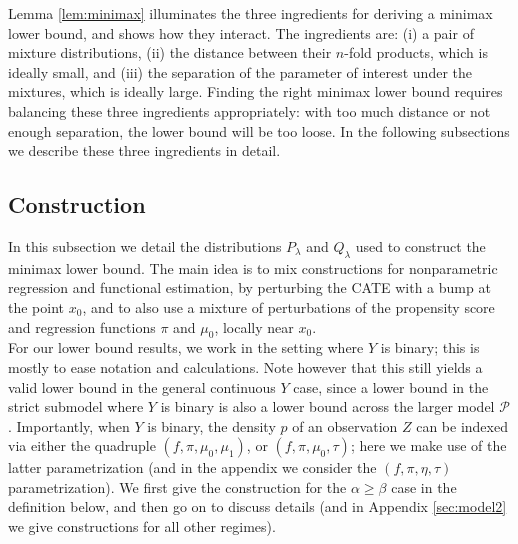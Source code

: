 \documentclass[11pt,twoside]{article}
\newcommand{\E}{\mathbb{E}}
\theoremstyle{definition}
\theoremstyle{remark}
\begin{document}
\bigskip

Lemma \ref{lem:minimax} illuminates the three ingredients for deriving a minimax lower bound, and shows how they interact. The ingredients are: (i) a pair of mixture distributions, (ii) the distance between their $n$-fold products, which is ideally small, and  (iii) the separation of the parameter of interest under the mixtures, which is ideally large. Finding the right minimax lower bound requires balancing these three ingredients appropriately: with too much distance or not enough separation,  the lower bound will be too loose. In the following subsections we describe these three ingredients in detail. \\

\subsection{Construction}

In this subsection we detail the distributions $P_\lambda$ and $Q_\lambda$ used to construct the minimax lower bound. 
The main idea is to mix constructions for nonparametric regression and functional estimation, by perturbing the CATE with a bump at the point $x_0$, and to also use a mixture of perturbations of the propensity score and regression functions $\pi$ and $\mu_0$,  locally near $x_0$.  \\

For our lower bound results, we work in the setting where $Y$ is binary; this is mostly to ease notation and calculations. Note however that this still yields a valid lower bound in the general continuous $Y$ case, since a lower bound in the strict submodel where $Y$ is binary is also a lower bound across the larger model $\mathcal{P}$. Importantly, when $Y$ is binary, the density $p$ of an observation $Z$ can be  indexed via either the quadruple $(f,\pi,\mu_0,\mu_1)$, or $(f,\pi,\mu_0,\tau)$; here we make use of the latter parametrization (and in the appendix we consider the $(f,\pi,\eta,\tau)$ parametrization). 
We first give the construction for the $\alpha \geq \beta$ case in the definition below, and then go on to discuss details (and in Appendix \ref{sec:model2} we give constructions for all other regimes). \\
\end{document}
